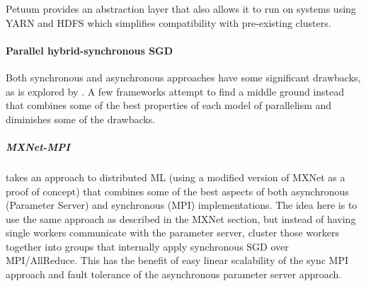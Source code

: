 Petuum provides an abstraction layer that also allows it to run on systems using YARN and HDFS which simplifies compatibility with pre-existing clusters. 


\paragraph{Parallel hybrid-synchronous SGD}
Both synchronous and asynchronous approaches have some significant drawbacks, as is explored by \citet{ChenJianmin2016}. A few frameworks attempt to find a middle ground instead that combines some of the best properties of each model of parallelism and diminishes some of the drawbacks.

\subparagraph{MXNet-MPI \citep{Mamidala2018}}
takes an approach to distributed ML (using a modified version of MXNet as a proof of concept) that combines some of the best aspects of both asynchronous (Parameter Server) and synchronous (MPI) implementations. The idea here is to use the same approach as described in the MXNet section, but instead of having single workers communicate with the parameter server, cluster those workers together into groups that internally apply synchronous SGD over MPI/AllReduce. This has the benefit of easy linear scalability of the sync MPI approach and fault tolerance of the asynchronous parameter server approach.


